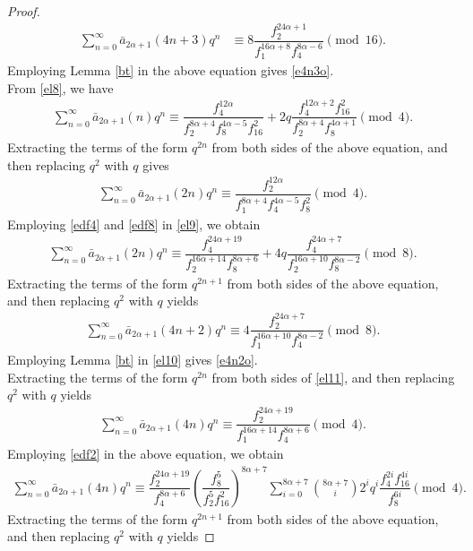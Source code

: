 \documentclass[10pt,a4paper]{amsart}
\begin{document}
\begin{proof}
\begin{align}
	\sum_{n=0}^{\infty}\bar{a}_{2\alpha+1}(4n+3)q^n&\equiv8\dfrac{f_2^{24\alpha+1}}{f_1^{16\alpha+8}f_4^{8\alpha-6}} \pmod{16}.
	\end{align}
	Employing Lemma \ref{bt} in the above equation gives \eqref{e4n3o}.\\
\indent From \eqref{el8}, we have
\begin{align*}
\sum_{n=0}^{\infty}\bar{a}_{2\alpha+1}(n)q^n\equiv\dfrac{f_4^{12\alpha}}{f_2^{8\alpha+4}f_8^{4\alpha-5}f_{16}^2}+2q\dfrac{f_4^{12\alpha+2}f_{16}^2}{f_2^{8\alpha+4}f_8^{4\alpha+1}}\pmod 4.
\end{align*}
Extracting the terms of the form $q^{2n}$ from both sides of the above equation, and then replacing $q^{2}$ with $q$ gives
\begin{align}\label{el9}
\sum_{n=0}^{\infty}\bar{a}_{2\alpha+1}(2n)q^n\equiv\dfrac{f_2^{12\alpha}}{f_1^{8\alpha+4}f_4^{4\alpha-5}f_{8}^2}\pmod 4.
\end{align}
Employing \eqref{edf4} and \eqref{edf8} in \eqref{el9}, we obtain
\begin{align}\label{el11}
\sum_{n=0}^{\infty}\bar{a}_{2\alpha+1}(2n)q^n\equiv\dfrac{f_4^{24\alpha+19}}{f_2^{16\alpha+14}f_8^{8\alpha+6}}+4q\dfrac{f_4^{24\alpha+7}}{f_2^{16\alpha+10}f_8^{8\alpha-2}}\pmod 8.
\end{align}
Extracting the terms of the form $q^{2n+1}$ from both sides of the above equation, and then replacing $q^{2}$ with $q$ yields
	\begin{align}\label{el10}
	\sum_{n=0}^{\infty}\bar{a}_{2\alpha+1}(4n+2)q^n\equiv4\dfrac{f_2^{24\alpha+7}}{f_1^{16\alpha+10}f_4^{8\alpha-2}}\pmod 8.
	\end{align}
	Employing Lemma \ref{bt} in \eqref{el10} gives \eqref{e4n2o}.\\
	\indent	Extracting the terms of the form $q^{2n}$ from both sides of \eqref{el11}, and then replacing $q^{2}$ with $q$ yields 
		\begin{align*}
		\sum_{n=0}^{\infty}\bar{a}_{2\alpha+1}(4n)q^n\equiv\dfrac{f_2^{24\alpha+19}}{f_1^{16\alpha+14}f_4^{8\alpha+6}}\pmod 4.
		\end{align*}
			Employing \eqref{edf2} in the above equation, we obtain
		\begin{align*}
			\sum_{n=0}^{\infty}\bar{a}_{2\alpha+1}(4n)q^n\equiv\dfrac{f_2^{24\alpha+19}}{f_4^{8\alpha+6}}\left(\dfrac{f_8^5}{f_2^5f_{16}^2}\right)^{8\alpha+7}\sum_{i=0}^{8\alpha+7}\binom{8\alpha+7}{i}2^iq^i\dfrac{f_4^{2i}f_{16}^{4i}}{f_8^{6i}}\pmod 4.
		\end{align*}
		Extracting the terms of the form $q^{2n+1}$ from both sides of the above equation, and then replacing $q^{2}$ with $q$ yields

\end{proof}
\end{document}
